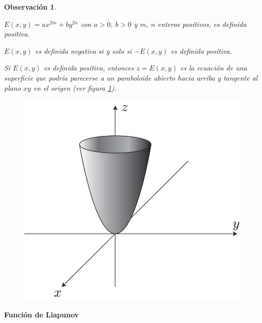 \documentclass[a5paper,doc,10pt,noapacite]{apa6}
\newtheorem{observ}{Observación}
\newcommand{\neodefi}[1]{%
	\vspace{1\baselineskip}
	\textbf{\small#1} \newline
}
\begin{document}
{{\begin{observ}\quad
	\begin{APAitemize}
		\item \(E(x,y)=ax^{2m} + by^{2n}\) con \(a>0\), \(b>0\) y \(m\), \(n\) enteros positivos, es definida positiva.
		\item \(E(x,y)\) es definida negativa si y solo si \(-E(x,y)\) es definida positiva.
		\item Si \(E(x,y)\) es definida positiva, entonces \(z=E(x,y)\) es la ecuación de una superficie que podría parecerse a un paraboloide abierto hacia arriba y tangente al plano \(xy\) en el origen (ver figura \ref{fig:M-18}).
		\vspace{-1\baselineskip}
	\begin{figure}[H]
		\captionsetup{justification=centering, labelfont=footnotesize, font=footnotesize}
		\centering
		\includegraphics[scale=0.35]{Graficos/figura18}
	
		\caption{ }
		\label{fig:M-18}
	\end{figure}	\end{APAitemize}
\end{observ}


\neodefi{Función de Liapunov}

}}
\end{document}
